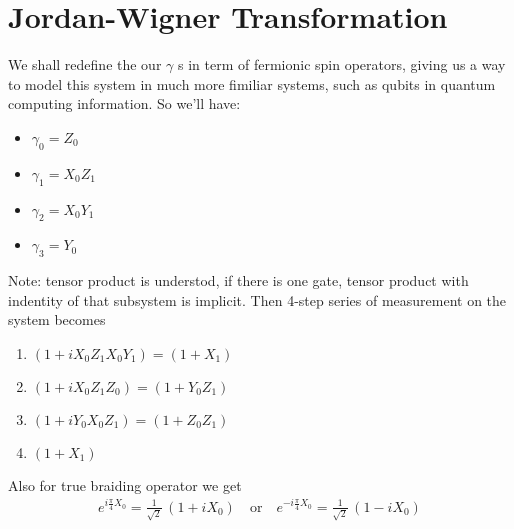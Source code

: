 \documentclass{article}
\begin{document}
\section{Jordan-Wigner Transformation} %
\label{sec:Jordan-Wigner Transformation}
We shall redefine the our $ \gamma $ s in term of fermionic spin operators, giving us a way to model
this system in much more fimiliar systems, such as qubits in quantum computing information. So we'll have:
\begin{itemize}
	\item $ \gamma_0 = Z_0 $
	\item $ \gamma_1 = X_0 Z_1 $
	\item $ \gamma_2 = X_0 Y_1 $
	\item $ \gamma_3 = Y_0 $
\end{itemize}
Note: tensor product is understod, if there is one gate, tensor product with indentity of that subsystem is implicit.
Then 4-step series of measurement on the system becomes
\begin{enumerate}
	\item $ (1 + i X_0 Z_1 X_0 Y_1) = (1 + X_1) $
	\item $ (1 + i X_0 Z_1 Z_0) = (1 + Y_0 Z_1) $
	\item $ (1 + i Y_0 X_0 Z_1) = (1 + Z_0 Z_1) $
	\item $ (1 + X_1) $
\end{enumerate}
Also for true braiding operator we get
$$
	\begin{aligned}
		e^{i \frac{\pi}{4} X_0} = \frac{1}{\sqrt{2}}\, (1 + i X_0 ) \quad \text{or} \quad
		e^{-i \frac{\pi}{4} X_0} = \frac{1}{\sqrt{2}}\, (1 - i X_0 )
		\label{eq:br Jordan-Wigner}
	\end{aligned}
$$
\end{document}
